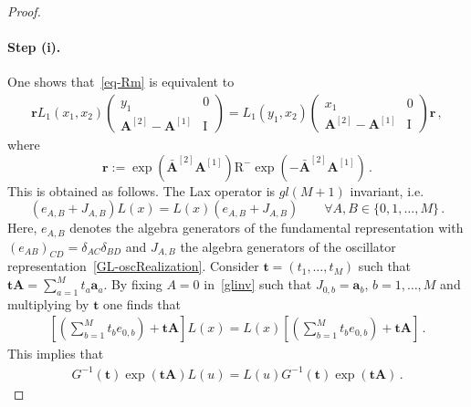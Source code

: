 \documentclass[11pt]{article}
\numberwithin{equation}{section}
\newcommand{\OA}{\mathbf{A}}
\newcommand{\OAD}{\mathbf{\bar{A}}}
\newcommand{\M}{M}
\newcommand{\ID}{\mathrm{I}}
\newcommand{\abrOSCR}{\mathrm{R}}
\begin{document}
\begin{proof}
\paragraph{Step (i).} One shows that~\eqref{eq-Rm} is equivalent to
\begin{equation}\label{equivalent-def-2}
	\begin{split}
		\mathbf{r}L_{1}(x_{1},x_{2})\left(\begin{array}{cc}
			y_1&0\\
			\OA^{[2]}-\OA^{[1]}&\ID
		\end{array}\right)=
		L_{1}(y_{1},x_{2})\left(\begin{array}{cc}
			x_1&0\\
			\OA^{[2]}-\OA^{[1]}&\ID
		\end{array}\right)\mathbf{r}\,,
	\end{split}
\end{equation}
where
\begin{equation}\label{r-definition}
	\mathbf{r}:=\exp{\left(\OAD^{[2]}\OA^{[1]}\right)}\abrOSCR^{-}\exp{\left(-\OAD^{[2]}\OA^{[1]}\right)}\,.
\end{equation}
This is obtained as follows. The Lax operator is $gl(\M+1)$ invariant, i.e.
\begin{equation}\label{glinv}
	\left(e_{A,B}+ J_{A,B}\right)L(x)=L(x)(e_{A,B}+ J_{A,B})\qquad \forall A,B\in \{0,1,\ldots, \M\}\,.
\end{equation}
Here, $e_{A,B}$ denotes the algebra generators of the fundamental representation with $(e_{AB})_{CD}=\delta_{AC}\delta_{BD}$ and $J_{A,B}$ the algebra generators of the oscillator representation~\eqref{GL-oscRealization}. Consider $\mathbf{t}=(t_{1},\ldots,t_{M})$ such that $\mathbf{t}\OA=\sum_{a=1}^{\M}t_{a}\mathbf{a}_{a}$. By fixing $A=0$ in~\eqref{glinv} such that $J_{0,b}=\mathbf{a}_{b}$, $b=1,\ldots,\M$ and multiplying by $\mathbf{t}$ one finds that
\begin{equation}
	\begin{split}
		\left[\left(\sum_{b=1}^{\M}t_{b}e_{0,b}\right)+ \mathbf{t}\OA\right]L(x)=L(x)\left[\left(\sum_{b=1}^{\M}t_{b}e_{0,b}\right)+ \mathbf{t}\OA\right]\,.
	\end{split}
\end{equation}
This implies that
\begin{equation}
	\begin{split}G^{-1}(\mathbf{t})\exp{\left(\mathbf{t}\OA\right)}L(u)=L(u)G^{-1}(\mathbf{t})\exp{\left(\mathbf{t}\OA\right)}\,.
	\end{split}

\end{equation}
\end{proof}
\end{document}
